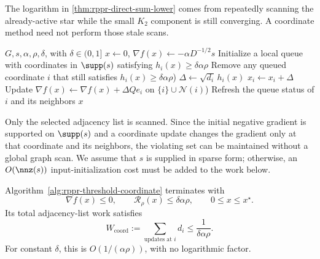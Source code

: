 The logarithm in \cref{thm:rppr-direct-sum-lower} comes from repeatedly
scanning the already-active star while the small \(K_2\) component is still
converging.  A coordinate method need not perform those stale scans.

\begin{algorithm}[t]
\caption{Residual-thresholded coordinate ISTA}
\label{alg:rppr-threshold-coordinate}
\begin{algorithmic}[1]
\REQUIRE \(G,s,\alpha,\rho,\delta\), with \(\delta\in(0,1]\)
\STATE \(x\gets0\), \(\nabla f(x)\gets-\alpha D^{-1/2}s\)
\STATE Initialize a local queue with coordinates in \(\supp(s)\) satisfying
       \(h_i(x)\geq\delta\alpha\rho\)
    \STATE Remove any queued coordinate \(i\) that still satisfies
           \(h_i(x)\geq\delta\alpha\rho\))
    \STATE \(\Delta\gets\sqrt{d_i}\,h_i(x)\)
    \STATE \(x_i\gets x_i+\Delta\)
    \STATE Update \(\nabla f(x)\gets\nabla f(x)+\Delta Qe_i\) on
           \(\{i\}\cup\mathcal{N}(i)\))
    \STATE Refresh the queue status of \(i\) and its neighbors
\ENDWHILE
\RETURN \(x\)
\end{algorithmic}
\end{algorithm}

Only the selected adjacency list is scanned.  Since the initial negative
gradient is supported on \(\supp(s)\) and a coordinate update changes the
gradient only at that coordinate and its neighbors, the violating set can be
maintained without a global graph scan.  We assume that \(s\) is supplied in
sparse form; otherwise, an \(O(\nnz(s))\) input-initialization cost must be
added to the work below.

\begin{theorem}
\label{thm:rppr-threshold-coordinate-work}
Algorithm~\ref{alg:rppr-threshold-coordinate} terminates with
\begin{equation}
    \nabla f(x)\leq0,
    \qquad
    \mathcal{R}_\rho(x)\leq\delta\alpha\rho,
    \qquad
    0\leq x\leq x^\star.
    \label{eq:rppr-coordinate-certificate}
\end{equation}
Its total adjacency-list work satisfies
\begin{equation}
    W_{\mathrm{coord}}
    :=\sum_{\text{updates at }i}d_i
    \leq\frac{1}{\delta\alpha\rho}.
    \label{eq:rppr-coordinate-work-bound}
\end{equation}
For constant \(\delta\), this is
\(O(1/(\alpha\rho))\), with no logarithmic factor.
\end{theorem}

